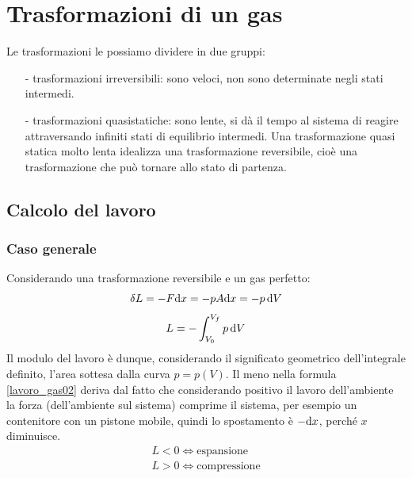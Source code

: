 \section{Trasformazioni di un gas}
Le trasformazioni le possiamo dividere in due gruppi:
\begin{itemize}
\item[-]trasformazioni irreversibili: sono veloci, non sono determinate negli stati intermedi.
\item[-]trasformazioni quasistatiche: sono lente, si dà il tempo al sistema di reagire attraversando infiniti stati di equilibrio intermedi. Una trasformazione quasi statica molto lenta idealizza una trasformazione reversibile, cioè una trasformazione che può tornare allo stato di partenza.
\end{itemize}

\subsection{Calcolo del lavoro}
\subsubsection{Caso generale}
Considerando una trasformazione reversibile e un gas perfetto:
\begin{equation*}\delta L=-F\mathrm{d} x=-pA\mathrm{d} x=-p\,\mathrm{d} V\end{equation*}
\begin{equation}
L=-\int_{V_0}^{V_f} p\,\mathrm{d} V
\label{lavoro_gas02}
\end{equation}
Il modulo del lavoro è dunque, considerando il significato geometrico dell'integrale definito, l'area sottesa dalla curva $p=p(V)$. Il meno nella formula \eqref{lavoro_gas02} deriva dal fatto che considerando positivo il lavoro dell'ambiente la forza (dell'ambiente sul sistema) comprime il sistema, per esempio un contenitore con un pistone mobile, quindi lo spostamento è $-\mathrm{d} x$, perché $x$ diminuisce.
\begin{equation*}\begin{array}{l}
L<0 \Leftrightarrow \text{espansione}\\
L>0 \Leftrightarrow \text{compressione}\\
\end{array}\end{equation*}

